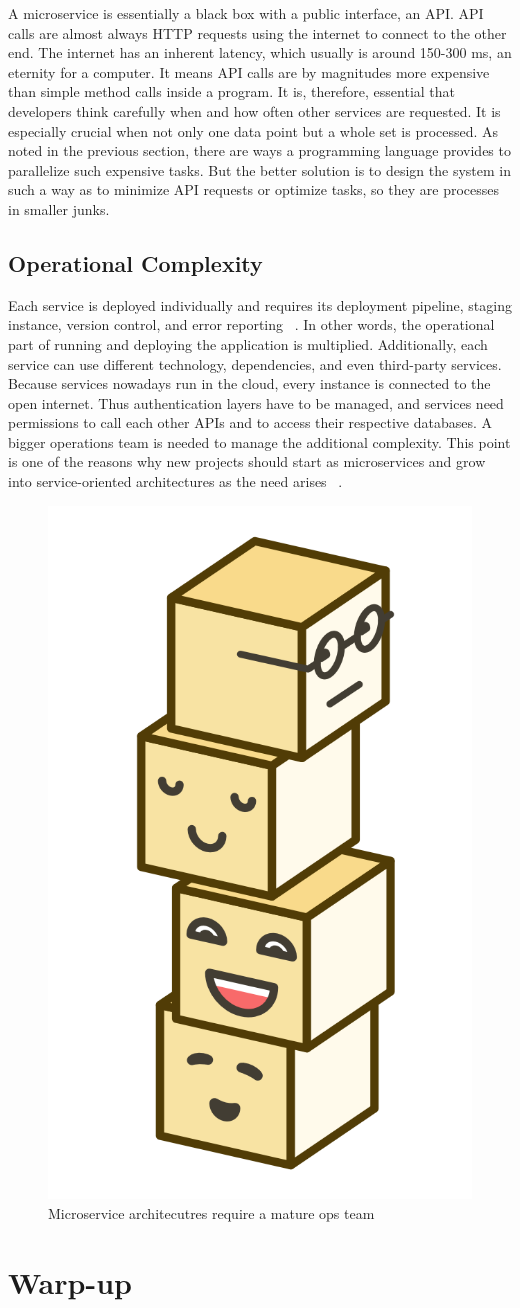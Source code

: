 A microservice is essentially a black box with a public interface, an API. API calls are almost always HTTP requests using the internet to connect to the other end. The internet has an inherent latency, which usually is around 150-300 ms, an eternity for a computer. It means API calls are by magnitudes more expensive than simple method calls inside a program. It is, therefore, essential that developers think carefully when and how often other services are requested. It is especially crucial when not only one data point but a whole set is processed. As noted in the previous section, there are ways a programming language provides to parallelize such expensive tasks. But the better solution is to design the system in such a way as to minimize API requests or optimize tasks, so they are processes in smaller junks.


\subsection{Operational Complexity}

Each service is deployed individually and requires its deployment pipeline, staging instance, version control, and error reporting ~\cite{fachat.2019.1}. In other words, the operational part of running and deploying the application is multiplied. Additionally, each service can use different technology, dependencies, and even third-party services. Because services nowadays run in the cloud, every instance is connected to the open internet. Thus authentication layers have to be managed, and services need permissions to call each other APIs and to access their respective databases. A bigger operations team is needed to manage the additional complexity. This point is one of the reasons why new projects should start as microservices and grow into service-oriented architectures as the need arises ~\cite{krivtsov.2019}.

\begin{figure}[ht]
  \centering
  \includegraphics[width=0.25\linewidth]{assets/illustration-microservice-stack.png}
  \caption{Microservice architecutres require a mature ops team}
\end{figure}


\section{Warp-up}

